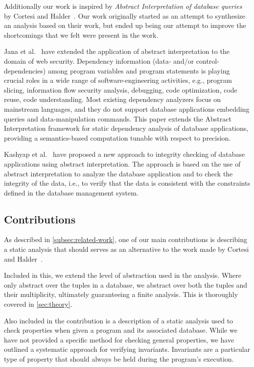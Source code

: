 Additionally our work is inspired by \emph{Abstract Interpretation of database queries} by Cortesi and Halder~\cite{halder_abstract_2012}.
Our work originally started as an attempt to synthesize an analysis based on their work, but ended up being our attempt to improve the shortcomings that we felt were present in the work.

Jana et al.~\cite{jana_extending_2020} have extended the application of abstract interpretation to the domain of web security.
Dependency information (data- and/or control-dependencies) among program variables and program statements is playing crucial roles in a wide range of software-engineering activities, e.g., program slicing, information flow security analysis, debugging, code optimization, code reuse, code understanding.
Most existing dependency analyzers focus on mainstream languages, and they do not support database applications embedding queries and data-manipulation commands.
This paper extends the Abstract Interpretation framework for static dependency analysis of database applications, providing a semantics-based computation tunable with respect to precision.

Kashyap et al.~\cite{kashyap_integrity_2022} have proposed a new approach to integrity checking of database applications using abstract interpretation.
The approach is based on the use of abstract interpretation to analyze the database application and to check the integrity of the data, i.e., to verify that the data is consistent with the constraints defined in the database management system.


\subsection{Contributions}\label{subsec:contributions}
As described in \autoref{subsec:related-work}, one of our main contributions is describing a static analysis that should serves as an alternative to the work made by Cortesi and Halder~\cite{halder_abstract_2012}.

Included in this, we extend the level of abstraction used in the analysis.
Where~\cite{halder_abstract_2012} only abstract over the tuples in a database, we abstract over both the tuples and their multiplicity, ultimately guaranteeing a finite analysis.
This is thoroughly covered in \autoref{sec:theory}.

Also included in the contribution is a description of a static analysis used to check properties when given a program and its associated database.
While we have not provided a specific method for checking general properties, we have outlined a systematic approach for verifying invariants.
Invariants are a particular type of property that should always be held during the program's execution.

